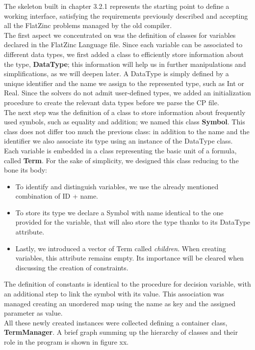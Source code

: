 The skeleton built in chapter 3.2.1 represents the starting point to define a working interface, satisfying the requirements previously described and accepting all the FlatZinc problems managed by the old compiler. \\
The first aspect we concentrated on was the definition of classes for variables declared in the FlatZinc Language file. Since each variable can be associated to different data types, we first added a class to efficiently store information about the type, \textbf{DataType}; this information will help us in further manipulations and simplifications, as we will deepen later. A DataType is simply defined by a unique identifier and the name we assign to the represented type, such as Int or Real. Since the solvers do not admit user-defined types, we added an initialization procedure to create the relevant data types before we parse the CP file. \\
The next step was the definition of a class to store information about frequently used symbols, such as equality and addition; we named this class \textbf{Symbol}. This class does not differ too much the previous class: in addition to the name and the identifier we also associate its type using an instance of the DataType class.\\
Each variable is embedded in a class representing the basic unit of a formula, called \textbf{Term}. For the sake of simplicity, we designed this class reducing to the bone its body:

\begin{itemize}
    \item To identify and distinguish variables, we use the already mentioned combination of ID + name.
    \item To store its type we declare a Symbol with name identical to the one provided for the variable, that will also store the type thanks to its DataType attribute.
    \item Lastly, we introduced a vector of Term called \textit{children}. When creating variables, this attribute remains empty. Its importance will be cleared when discussing the creation of constraints.
\end{itemize}

The definition of constants is identical to the procedure for decision variable, with an additional step to link the symbol with its value. This association was managed creating an unordered map using the name as key and the assigned parameter as value. \\
All these newly created instances were collected defining a container class, \textbf{TermManager}.
A brief graph summing up the hierarchy of classes and their role in the program is shown in figure xx. 

